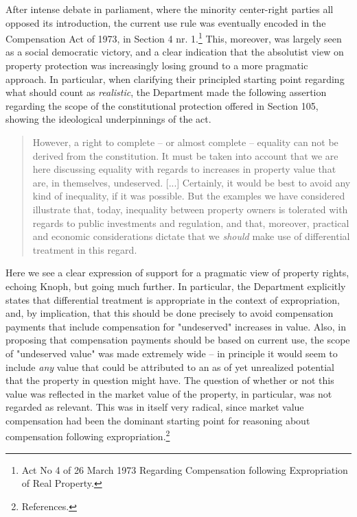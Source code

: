 \documentclass[10pt]{article} %
\begin{document}
After intense debate in parliament, where the minority center-right parties all opposed its introduction, the current use rule was eventually encoded in the Compensation Act of 1973, in Section 4 nr. 1.\footnote{Act No 4 of 26 March 1973 Regarding Compensation following Expropriation of Real Property.} This, moreover, was largely seen as a social democratic victory, and a clear indication that the absolutist view on property protection was increasingly losing ground to a more pragmatic approach. In particular, when clarifying their principled starting point regarding what should count as \emph{realistic}, the Department made the following assertion regarding the scope of the constitutional protection offered in Section 105, showing the ideological underpinnings of the act.

\begin{quote}
However, a right to complete -- or almost complete -- equality can not be derived from the constitution. It must be taken into account that we are here discussing equality with regards to increases in property value that are, in themselves, undeserved. [...]  %
Certainly, it would be best to avoid any kind of inequality, if it was possible. But the examples we have considered illustrate that, today, inequality between property owners is tolerated with regards to public investments and regulation, and that, moreover, practical and economic considerations dictate that we \emph{should} make use of differential treatment in this regard.
\end{quote}

Here we see a clear expression of support for a pragmatic view of property rights, echoing Knoph, but going much further. In particular, the Department explicitly states that differential treatment is appropriate in the context of expropriation, and, by implication, that this should be done precisely to avoid compensation payments that include compensation for "undeserved" increases in value. Also, in proposing that compensation payments should be based on current use, the scope of "undeserved value" was made extremely wide -- in principle it would seem to include \emph{any} value that could be attributed to an as of yet unrealized potential that the property in question might have. The question of whether or not this value was reflected in the market value of the property, in particular, was not regarded as relevant. This was in itself very radical, since market value compensation had been the dominant starting point for reasoning about compensation following expropriation.\footnote{References.}
\end{document}
